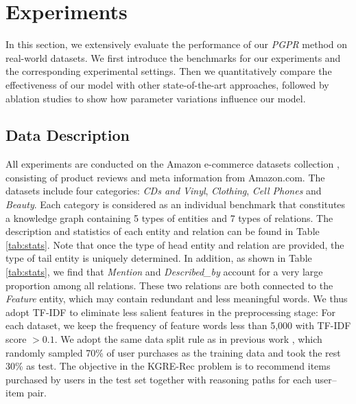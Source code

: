 \documentclass[sigconf]{acmart}
\begin{document}
\section{Experiments}\label{sec:exp}
In this section, we extensively evaluate the performance of our \emph{PGPR} method on  real-world datasets.
We first introduce the benchmarks for our experiments and the corresponding experimental settings. Then we quantitatively compare the effectiveness of our model with other state-of-the-art approaches, followed by ablation studies to show how parameter variations influence our model.

\subsection{Data Description}
All experiments are conducted on the Amazon e-commerce datasets collection \cite{he2016ups}, consisting of product reviews and meta information from Amazon.com.
The datasets include four categories: \emph{CDs and Vinyl}, \emph{Clothing}, \emph{Cell Phones} and \emph{Beauty}.
Each category is considered as an individual benchmark that constitutes a knowledge graph containing 5 types of entities and 7 types of relations.
The description and statistics of each entity and relation can be found in Table \ref{tab:stats}.
Note that once the type of head entity and relation are provided, the type of tail entity is uniquely determined.
In addition, as shown in Table \ref{tab:stats}, we find that \emph{Mention} and \emph{Described\_by} account for a very large proportion among all relations. 
These two relations are both connected to the \emph{Feature} entity, which may contain redundant and less meaningful words. We thus adopt TF-IDF to eliminate less salient features in the preprocessing stage: For each dataset, we keep the frequency of feature words less than 5,000 with TF-IDF score $> 0.1$. We adopt the same data split rule as in previous work \cite{zhang2017joint}, which randomly sampled 70\% of user purchases as the training data and took the rest 30\% as test. The objective in the KGRE-Rec problem is to recommend items purchased by users in the test set together with reasoning paths for each user--item pair.
\end{document}
